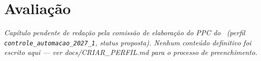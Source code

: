 \chapter{Avaliação}

\textit{Capítulo pendente de redação pela comissão de elaboração do PPC do
\ppccurso\ (perfil \texttt{controle\_automacao\_2027\_1}, status
proposta). Nenhum conteúdo definitivo foi escrito aqui — ver
docs/CRIAR\_PERFIL.md para o processo de preenchimento.}
